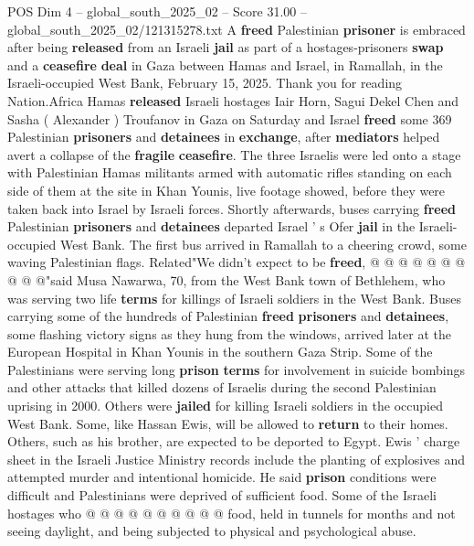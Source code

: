 \begin{textsample}{POS Dim 4 – global\_south\_2025\_02 – Score 31.00 – global\_south\_2025\_02/121315278.txt}  \label{ex:f4_pos_027}
A \textbf{freed} Palestinian \textbf{prisoner} is embraced after being \textbf{released} from an Israeli \textbf{jail} as part of a hostages-prisoners \textbf{swap} and a \textbf{ceasefire} \textbf{deal} in Gaza between Hamas and Israel, in Ramallah, in the Israeli-occupied West Bank, February 15, 2025.
Thank you for reading Nation.Africa Hamas \textbf{released} Israeli hostages Iair Horn, Sagui Dekel Chen and Sasha ( Alexander ) Troufanov in Gaza on Saturday and Israel \textbf{freed} some 369 Palestinian \textbf{prisoners} and \textbf{detainees} in \textbf{exchange}, after \textbf{mediators} helped avert a collapse of the \textbf{fragile} \textbf{ceasefire}.
The three Israelis were led onto a stage with Palestinian Hamas militants armed with automatic rifles standing on each side of them at the site in Khan Younis, live footage showed, before they were taken back into Israel by Israeli forces.
Shortly afterwards, buses carrying \textbf{freed} Palestinian \textbf{prisoners} and \textbf{detainees} departed Israel ' s Ofer \textbf{jail} in the Israeli-occupied West Bank.
The first bus arrived in Ramallah to a cheering crowd, some waving Palestinian flags.
Related"We didn't expect to be \textbf{freed}, @ @ @ @ @ @ @ @ @ @"said Musa Nawarwa, 70, from the West Bank town of Bethlehem, who was serving two life \textbf{terms} for killings of Israeli soldiers in the West Bank.
Buses carrying some of the hundreds of Palestinian \textbf{freed} \textbf{prisoners} and \textbf{detainees}, some flashing victory signs as they hung from the windows, arrived later at the European Hospital in Khan Younis in the southern Gaza Strip.
Some of the Palestinians were serving long \textbf{prison} \textbf{terms} for involvement in suicide bombings and other attacks that killed dozens of Israelis during the second Palestinian uprising in 2000.
Others were \textbf{jailed} for killing Israeli soldiers in the occupied West Bank.
Some, like Hassan Ewis, will be allowed to \textbf{return} to their homes.
Others, such as his brother, are expected to be deported to Egypt.
Ewis ' charge sheet in the Israeli Justice Ministry records include the planting of explosives and attempted murder and intentional homicide.
He said \textbf{prison} conditions were difficult and Palestinians were deprived of sufficient food.
Some of the Israeli hostages who @ @ @ @ @ @ @ @ @ @ food, held in tunnels for months and not seeing daylight, and being subjected to physical and psychological abuse.

\end{textsample}
